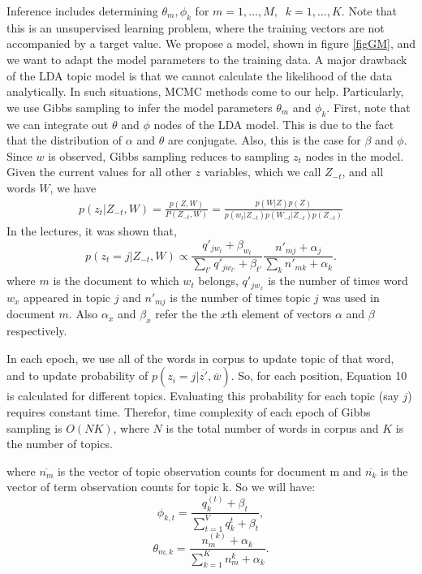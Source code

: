 \documentclass[twoside,12pt]{article}
\begin{document}
Inference includes determining $\theta_m, \phi_k$ for $m=1,\ldots,M,\;\; k=1,\ldots,K$. Note that this is an unsupervised learning problem, where the training vectors are not accompanied by a target value. We propose a model, shown in figure \ref{figGM}, and we want to adapt the model parameters to the training data. A major drawback of the LDA topic model is that we cannot calculate the likelihood of the data analytically. In such situations, MCMC methods come to our help. Particularly, we use Gibbs sampling to infer the model parameters $\theta_m$ and $\phi_k$. First, note that we can integrate out $\theta$ and $\phi$ nodes of the LDA model. This is due to the fact that the distribution of $\alpha$ and $\theta$ are conjugate. Also, this is the case for $\beta$ and $\phi$. Since $w$ is observed, Gibbs sampling reduces to sampling $z_t$ nodes in the model. Given the current values for all other $z$ variables, which we call $Z_{-t}$, and all words $W$, we have
\begin{align}
p(z_t|Z_{-t},W)=\frac{p(Z,W)}{P(Z_{-t},W)}=\frac{p(W|Z)p(Z)}{p(w_t|Z_{-t})p(W_{-t}|Z_{-t})p(Z_{-t})}
\end{align}
In the lectures, it was shown that,
\begin{equation}
p(z_t=j|Z_{-t},W)\propto \frac{q'_{jw_t}+\beta_{w_t}}{\sum_{t'} q'_{jw_{t'}}+\beta_{t'}}\frac{n'_{mj}+\alpha_j}{\sum_k n'_{mk}+\alpha_k}.
\end{equation}
where $m$ is the document to which $w_t$ belongs, $q'_{jw_{x}}$ is the number of times word $w_x$ appeared in topic $j$ and $n'_{mj}$ is the number of times topic $j$ was used in document $m$. Also $\alpha_x$ and $\beta_x$ refer the the $x$th element of vectors $\alpha$ and $\beta$ respectively.

In each epoch, we use all of the words in corpus to update topic of that word, and to update probability of $p(z_i=j|\overline{z'},\bar{w})$. So, for each position, Equation 10 is calculated for different topics. Evaluating this probability for each topic (say $j$) requires constant time. Therefor, time complexity of each epoch of Gibbs sampling is $O(NK)$, where $N$ is the total number of words in corpus and $K$ is the number of topics.

where $\overline{n_m}$ is the vector of topic observation counts for document m and $\overline{n_k}$ is the vector of term observation counts for topic k. So we will have:
\begin{equation}
\phi_{k,t}=\frac{q_k^{(t)}+\beta_t}{\sum_{t=1}^V q_k^{t}+\beta_t},
\end{equation}
\begin{equation}
\theta_{m,k}=\frac{n_m^{(k)}+\alpha_k}{\sum_{k=1}^K n_m^{k}+\alpha_k}.
\end{equation}
\end{document}
